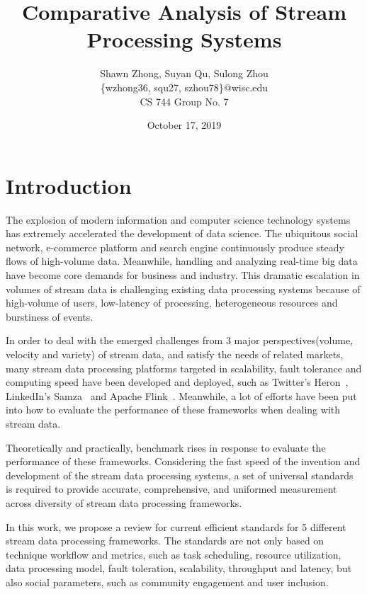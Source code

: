 \documentclass[pdftex,twocolumn,10pt,letterpaper]{article}
\begin{document}
\title{ Comparative Analysis of Stream Processing Systems }
\author{
    Shawn Zhong, Suyan Qu, Sulong Zhou \\
    \{wzhong36, squ27, szhou78\}@wisc.edu\\
    CS 744 Group No. 7
}
\date{October 17, 2019}


\maketitle

\section{Introduction}

The explosion of modern information and computer science technology systems has extremely accelerated the development of data science. The ubiquitous social network, e-commerce platform and search engine continuously produce steady flows of high-volume data. Meanwhile, handling and analyzing real-time big data have become core demands for business and industry. This dramatic escalation in volumes of stream data is challenging existing data processing systems because of high-volume of users, low-latency of processing, heterogeneous resources and burstiness of events.  

In order to deal with the emerged challenges from 3 major perspectives(volume, velocity and variety) of stream data, and satisfy the needs of related markets, many stream data processing platforms targeted in scalability, fault tolerance and computing speed have been developed and deployed, such as Twitter’s Heron~\cite{Kulkarni:2015:THS:2723372.2742788}, LinkedIn’s Samza~\cite{Noghabi:2017:SSS:3137765.3137770} and Apache Flink~\cite{Carbone2015ApacheFS}. Meanwhile, a lot of efforts have been put into how to evaluate the performance of these frameworks when dealing with stream data. 

Theoretically and practically, benchmark rises in response to evaluate the performance of these frameworks. Considering the fast speed of the invention and development of the stream data processing systems, a set of universal standards is required to provide accurate, comprehensive, and uniformed measurement across diversity of stream data processing frameworks. 

In this work, we propose a review for current efficient standards for 5 different stream data processing frameworks. The standards are not only based on technique workflow and metrics, such as task scheduling, resource utilization, data processing model, fault toleration, scalability, throughput and latency, but also social parameters, such as community engagement and user inclusion.
\end{document}

